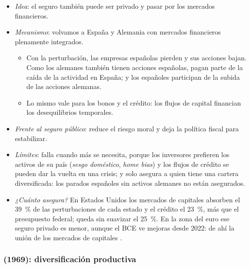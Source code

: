 \documentclass[11pt]{article}
\begin{document}
\begin{itemize}
\item \emph{Idea}: el seguro también puede ser privado y pasar por los mercados financieros\nocite{Ingram1959State,Ingram1973Case}.
\item \emph{Mecanismo}: volvamos a España y Alemania con mercados financieros plenamente integrados.
  \begin{itemize}
  \item Con la perturbación, las empresas españolas pierden y sus acciones bajan. Como los alemanes también tienen acciones españolas, pagan parte de la caída de la actividad en España; y los españoles participan de la subida de las acciones alemanas.
  \item Lo mismo vale para los bonos y el crédito: los flujos de capital financian los desequilibrios temporales.
  \end{itemize}
\item \emph{Frente al seguro público}: reduce el riesgo moral y deja la política fiscal para estabilizar.
\item \emph{Límites}: falla cuando más se necesita, porque los inversores prefieren los activos de su país (\emph{sesgo doméstico}, \emph{home bias}) y los flujos de crédito se pueden dar la vuelta en una crisis; y solo asegura a quien tiene una cartera diversificada: los parados españoles sin activos alemanes no están asegurados.
\item \emph{¿Cuánto asegura?} En Estados Unidos los mercados de capitales absorben el 39~\% de las perturbaciones de cada estado y el crédito el 23~\%, más que el presupuesto federal; queda sin suavizar el 25~\%\nocite{AsdrubaliSorensenYosha1996Channels}. En la zona del euro ese seguro privado es menor, aunque el BCE ve mejoras desde 2022\nocite{BCE2026IntegracionFinanciera}: de ahí la unión de los mercados de capitales .
\end{itemize}

\subsubsection{ (1969): diversificación productiva}\label{sec:kenen-diversificacion}
\end{document}
